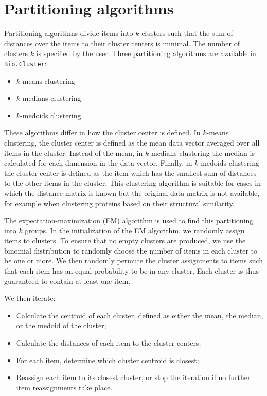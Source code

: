 \documentclass{report}
\begin{document}
\section{Partitioning algorithms}

Partitioning algorithms divide items into $k$ clusters such that the sum of distances over the items to their cluster centers is minimal.
The number of clusters $k$ is specified by the user.
Three partitioning algorithms are available in \verb|Bio.Cluster|:
\begin{itemize}
\item $k$-means clustering
\item $k$-medians clustering
\item $k$-medoids clustering
\end{itemize}
These algorithms differ in how the cluster center is defined. In $k$-means clustering, the cluster center is defined as the mean data vector averaged over all items in the cluster. Instead of the mean, in $k$-medians clustering the median is calculated for each dimension in the data vector. Finally, in $k$-medoids clustering the cluster center is defined as the item which has the smallest sum of distances to the other items in the cluster. This clustering algorithm is suitable for cases in which the distance matrix is known but the original data matrix is not available, for example when clustering proteins based on their structural similarity.

The expectation-maximization (EM) algorithm is used to find this partitioning into $k$ groups.
In the initialization of the EM algorithm, we randomly assign items to clusters. To ensure that no empty clusters are produced, we use the binomial distribution to randomly choose the number of items in each cluster to be one or more. We then randomly permute the cluster assignments to items such that each item has an equal probability to be in any cluster. Each cluster is thus guaranteed to contain at least one item.

We then iterate:
\begin{itemize}
\item Calculate the centroid of each cluster, defined as either the mean, the median, or the medoid of the cluster;
\item Calculate the distances of each item to the cluster centers;
\item For each item, determine which cluster centroid is closest;
\item Reassign each item to its closest cluster, or stop the iteration if no further item reassignments take place.
\end{itemize}
\end{document}
